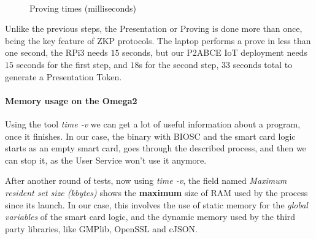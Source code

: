\begin{figure}[bth]
	\myfloatalign
	 \quad
	 \\
	\caption{Proving times (milliseconds)}
	\label{fig:proving:graph}
\end{figure}

Unlike the previous steps, the Presentation or Proving is done more than once, being the key feature of ZKP protocols. The laptop performs a prove in less than one second, the RPi3 needs $15$ seconds, but our P2ABCE IoT deployment needs $15$ seconds for the first step, and $18$s for the second step, $33$ seconds total to generate a Presentation Token.




\hfil

\paragraph{Memory usage on the Omega2}
Using the tool \textit{time -v} we can get a lot of useful information about a program, once it finishes. In our case, the binary with BIOSC and the smart card logic starts as an empty smart card, goes through the described process, and then we can stop it, as the User Service won't use it anymore.

After another round of tests, now using \textit{time -v}, the field named \textit{Maximum resident set size (kbytes)} shows the \textbf{maximum} size of RAM used by the process since its launch. In our case, this involves the use of static memory for the \textit{global variables} of the smart card logic, and the dynamic memory used by the third party libraries, like GMPlib, OpenSSL and cJSON.

